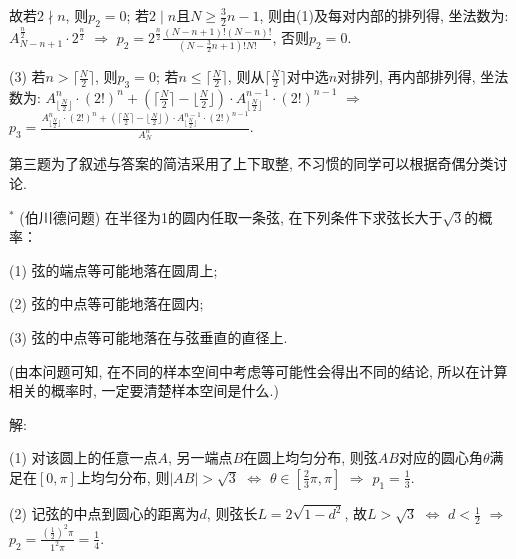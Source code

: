 \documentclass[standard]{ExBook}
\begin{document}
\begin{qitems}
\begin{bbox}
故若$2 \nmid n$, 则$p_{2}=0$; 若$2 \mid n$且$N\geq \frac{3}{2}n-1$, 则由(1)及每对内部的排列得, 坐法数为: $A_{N-n+1}^{\frac{n}{2}}\cdot 2^{\frac{n}{2}}$ $\Longrightarrow$ $p_{2}=2^{\frac{n}{2}}\frac{(N-n+1)!(N-n)!}{(N-\frac{3}{2}n+1)!N!}$, 否则$p_{2}=0$.

(3) 若$n>\lceil\frac{N}{2}\rceil$, 则$p_{3}=0$; 若$n \leq \lceil\frac{N}{2}\rceil$, 则从$\lceil\frac{N}{2}\rceil$对中选$n$对排列, 再内部排列得, 坐法数为: $A_{\lfloor\frac{N}{2}\rfloor}^{n}\cdot(2!)^{n}+(\lceil\frac{N}{2}\rceil-\lfloor\frac{N}{2}\rfloor)\cdot A_{\lfloor\frac{N}{2}\rfloor}^{n-1}\cdot(2!)^{n-1}$ $\Longrightarrow$ $p_{3}=\frac{A_{\lfloor\frac{N}{2}\rfloor}^{n}\cdot(2!)^{n}+(\lceil\frac{N}{2}\rceil-\lfloor\frac{N}{2}\rfloor)\cdot A_{\lfloor\frac{N}{2}\rfloor}^{n-1}\cdot(2!)^{n-1}}{A_{N}^{n}}$.

\textcolor{themeColor}{\selectfont {} 第三题为了叙述与答案的简洁采用了上下取整, 不习惯的同学可以根据奇偶分类讨论.}
    \end{bbox}

\vspace{-5em}

    \begin{bbox}
    \begin{shaded}
        \qitem$^*$
(伯川德问题) 在半径为1的圆内任取一条弦, 在下列条件下求弦长大于$\sqrt{3}$的概率：

(1) 弦的端点等可能地落在圆周上;

(2) 弦的中点等可能地落在圆内;

(3) 弦的中点等可能地落在与弦垂直的直径上.

(由本问题可知, 在不同的样本空间中考虑等可能性会得出不同的结论, 所以在计算相关的概率时, 一定要清楚样本空间是什么.)
    \end{shaded}
    \end{bbox}

\vspace{-5em}

    \begin{bbox}
解:

(1) 对该圆上的任意一点$A$, 另一端点$B$在圆上均匀分布, 则弦$AB$对应的圆心角$\theta$满足在$[0,\pi]$上均匀分布, 则$|AB| > \sqrt{3}$ $\Longleftrightarrow$ $\theta \in [\frac{2}{3}\pi,\pi]$ $\Longrightarrow$ $p_{1}=\frac{1}{3}$.

(2) 记弦的中点到圆心的距离为$d$, 则弦长$L=2\sqrt{1-d^2}$, 故$L > \sqrt{3}$ $\Longleftrightarrow$ $d < \frac{1}{2}$ $\Longrightarrow$ $p_{2}=\frac{(\frac{1}{2})^2\pi}{1^2\pi}=\frac{1}{4}$.


\end{bbox}
\end{qitems}
\end{document}
